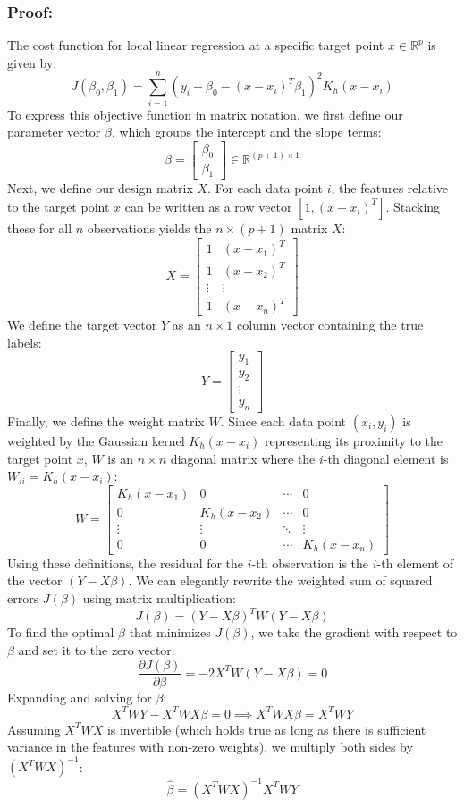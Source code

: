 \documentclass[twoside, 10pt]{article}
\begin{document}
\subsubsection{Proof:}
The cost function for local linear regression at a specific target point $x \in \mathbb{R}^{p}$ is given by:
\[
J(\beta_0, \beta_1) = \sum_{i=1}^{n} \left( y_i - \beta_0 - (x - x_i)^{T} \beta_1 \right)^{2} K_h(x - x_i)
\]
To express this objective function in matrix notation, we first define our parameter vector $\beta$, which groups the intercept and the slope terms:
\[
\beta = \begin{bmatrix} \beta_0 \\ \beta_1 \end{bmatrix} \in \mathbb{R}^{(p+1) \times 1}
\]
Next, we define our design matrix $X$. For each data point $i$, the features relative to the target point $x$ can be written as a row vector $[1, (x - x_i)^{T}]$. Stacking these for all $n$ observations yields the $n \times (p+1)$ matrix $X$:
\[
X = \begin{bmatrix} 1 & (x - x_1)^{T} \\ 1 & (x - x_2)^{T} \\ \vdots & \vdots \\ 1 & (x - x_n)^{T} \end{bmatrix}
\]
We define the target vector $Y$ as an $n \times 1$ column vector containing the true labels:
\[
Y = \begin{bmatrix} y_1 \\ y_2 \\ \vdots \\ y_n \end{bmatrix}
\]
Finally, we define the weight matrix $W$. Since each data point $(x_i, y_i)$ is weighted by the Gaussian kernel $K_h(x - x_i)$ representing its proximity to the target point $x$, $W$ is an $n \times n$ diagonal matrix where the $i$-th diagonal element is $W_{ii} = K_h(x - x_i)$:
\[
W = \begin{bmatrix} K_h(x - x_1) & 0 & \cdots & 0 \\ 0 & K_h(x - x_2) & \cdots & 0 \\ \vdots & \vdots & \ddots & \vdots \\ 0 & 0 & \cdots & K_h(x - x_n) \end{bmatrix}
\]
Using these definitions, the residual for the $i$-th observation is the $i$-th element of the vector $(Y - X\beta)$. We can elegantly rewrite the weighted sum of squared errors $J(\beta)$ using matrix multiplication:
\[
J(\beta) = (Y - X\beta)^{T} W (Y - X\beta)
\]
To find the optimal $\hat{\beta}$ that minimizes $J(\beta)$, we take the gradient with respect to $\beta$ and set it to the zero vector:
\[
\frac{\partial J(\beta)}{\partial \beta} = -2 X^{T} W (Y - X\beta) = 0
\]
Expanding and solving for $\beta$:
\[
X^{T} W Y - X^{T} W X \beta = 0 \implies X^{T} W X \beta = X^{T} W Y
\]
Assuming $X^{T} W X$ is invertible (which holds true as long as there is sufficient variance in the features with non-zero weights), we multiply both sides by $(X^{T} W X)^{-1}$:
\[
\hat{\beta} = (X^{T} W X)^{-1} X^{T} W Y
\]
\end{document}
